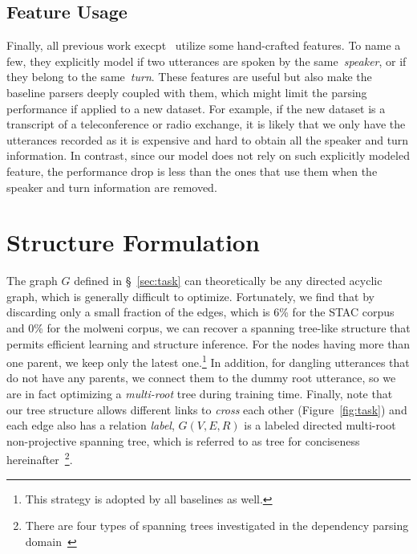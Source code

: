 \documentclass[11pt]{article}
\begin{document}
\subsection{Feature Usage}
\label{sec:feature}
Finally, all previous work execpt~\cite{liu-chen-2021-improving} utilize some hand-crafted features. To name a few, they explicitly model if two utterances are spoken by the same~\emph{speaker}, or if they belong to the same~\emph{turn}. These features are useful but also make the baseline parsers deeply coupled with them, which might limit the parsing performance if applied to a new dataset. For example, if the new dataset is a transcript of a teleconference or radio exchange, it is likely that we only have the utterances recorded as it is expensive and hard to obtain all the speaker and turn information. In contrast, since our model does not rely on such explicitly modeled feature, the performance drop is less than the ones that use them when the speaker and turn information are removed.

\section{Structure Formulation}
\label{sec:structure}
The graph $G$ defined in \S~\ref{sec:task} can theoretically be any directed acyclic graph, which is generally difficult to optimize. Fortunately, we find that by discarding only a small fraction of the edges, which is 6\% for the STAC corpus and 0\% for the molweni corpus, we can recover a spanning tree-like structure that permits efficient learning and structure inference.
For the nodes having more than one parent, we keep only the latest one.\footnote{This strategy is adopted by all baselines as well.} In addition, for dangling utterances that do not have any parents, we connect them to the dummy root utterance, so we are in fact optimizing a \emph{multi-root} tree during training time. Finally, note that our tree structure allows different links to \emph{cross} each other (Figure~\ref{fig:task}) and each edge also has a relation \emph{label}, $G(V, E, R)$ is a labeled directed multi-root non-projective spanning tree, which is referred to as tree for conciseness hereinafter~\footnote{There are four types of spanning trees investigated in the dependency parsing domain~\cite{mcdonald2005non,koo2007structured}}.
\end{document}

